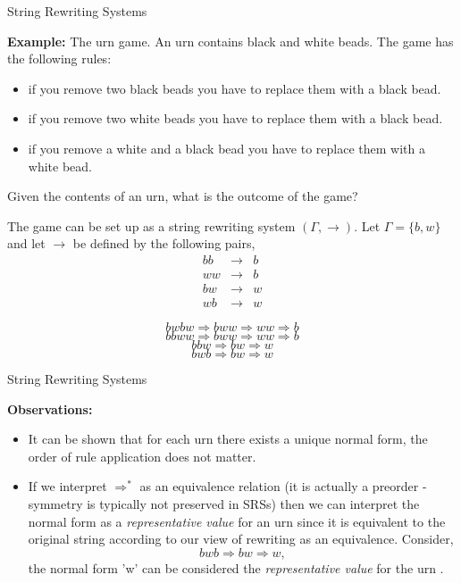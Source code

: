 \documentclass{beamer}
\begin{document}
\begin{frame}[fragile]{String Rewriting Systems}

\small

{\bf Example:} The urn game.  An urn contains black and white beads.  The game has the following rules:
{\scriptsize
\begin{itemize}
\item if you remove two black beads you have to replace them with a black bead.
\item if you remove two white beads you have to replace them with a black bead.
\item if you remove a white and a black bead you have to replace them with a white bead.
\end{itemize}
}
Given the contents of an urn, what is the outcome of the game?

\vspace{.1in}
The game can be set up as a string rewriting system $(\Gamma,\rightarrow)$.
 Let $\Gamma = \{ b, w \}$ and let $\rightarrow$ be defined by the following pairs,
\[
\begin{array}{rcl}
bb &\rightarrow& b\\
ww &\rightarrow& b\\
bw &\rightarrow& w\\
wb &\rightarrow& w
\end{array}
\]

{\scriptsize
\[
bwbw \Rightarrow bww \Rightarrow ww \Rightarrow b
\]
\[
bbww \Rightarrow bww \Rightarrow ww \Rightarrow b
\]
\[
bbw \Rightarrow bw \Rightarrow w
\]
\[
bwb \Rightarrow bw \Rightarrow w
\]
}
\end{frame}


\begin{frame}[fragile]{String Rewriting Systems}

\small
{\bf Observations:} 
\begin{itemize}
\item It can be shown that for each urn there exists a unique normal form, the order of rule application does not 
matter.
\item If we interpret $\Rightarrow^*$ as an equivalence relation (it is actually a preorder - symmetry is typically not preserved in SRSs) then we can 
interpret the normal form as a {\em representative value} for an urn since it is equivalent to the original string
according to our view of rewriting as an equivalence. Consider,
\[
bwb \Rightarrow bw \Rightarrow w,
\]
the normal form 'w' can be considered the {\em representative value} for the urn .
\end{itemize}
\end{frame}
\end{document}
